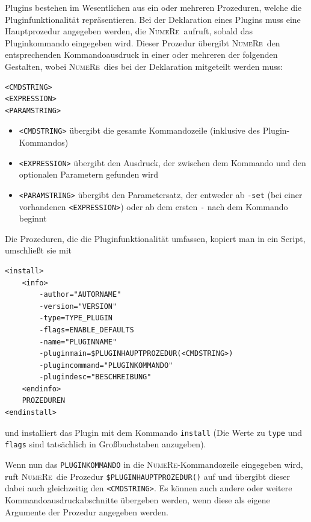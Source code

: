 \documentclass[DIV=14,headsepline,footsepline]{scrbook}
\newcommand{\NR}{\textsc{Nu\-me\-Re}}
\begin{document}
				Plugins bestehen im Wesentlichen aus ein oder mehreren Prozeduren, welche die Pluginfunktionalität repräsentieren. Bei der Deklaration eines Plugins muss eine Hauptprozedur angegeben werden, die \NR\ aufruft, sobald das Pluginkommando eingegeben wird. Dieser Prozedur übergibt \NR\ den entsprechenden Kommandoausdruck in einer oder mehreren der folgenden Gestalten, wobei \NR\ dies bei der Deklaration mitgeteilt werden muss:
				\begin{lstlisting}
<CMDSTRING>
<EXPRESSION>
<PARAMSTRING>
				\end{lstlisting}
				\begin{itemize}
					\item \lstinline+<CMDSTRING>+ übergibt die gesamte Kommandozeile (inklusive des Plugin-Kommandos)
					\item \lstinline+<EXPRESSION>+ übergibt den Ausdruck, der zwischen dem Kommando und den optionalen Parametern gefunden wird
					\item \lstinline+<PARAMSTRING>+ übergibt den Parametersatz, der entweder ab \lstinline+-set+ (bei einer vorhandenen \lstinline+<EXPRESSION>+) oder ab dem ersten \lstinline+-+ nach dem Kommando beginnt
				\end{itemize}
				
				Die Prozeduren, die die Pluginfunktionalität umfassen, kopiert man in ein Script, umschließt sie mit
				\begin{lstlisting}
<install>
	<info>
		-author="AUTORNAME"
		-version="VERSION"
		-type=TYPE_PLUGIN
		-flags=ENABLE_DEFAULTS
		-name="PLUGINNAME"
		-pluginmain=$PLUGINHAUPTPROZEDUR(<CMDSTRING>)
		-plugincommand="PLUGINKOMMANDO"
		-plugindesc="BESCHREIBUNG"
	<endinfo>
	PROZEDUREN
<endinstall>
				\end{lstlisting}
				und installiert das Plugin mit dem Kommando \lstinline+install+ (Die Werte zu \lstinline+type+ und \lstinline+flags+ sind tatsächlich in Großbuchstaben anzugeben).
				
				Wenn nun das \lstinline+PLUGINKOMMANDO+ in die \NR-Kommandozeile eingegeben wird, ruft \NR\ die Prozedur \lstinline+$PLUGINHAUPTPROZEDUR()+ auf und übergibt dieser dabei auch gleichzeitig den \lstinline+<CMDSTRING>+. Es können auch andere oder weitere Kommandoausdruckabschnitte übergeben werden, wenn diese als eigene Argumente der Prozedur angegeben werden.
				
\end{document}
